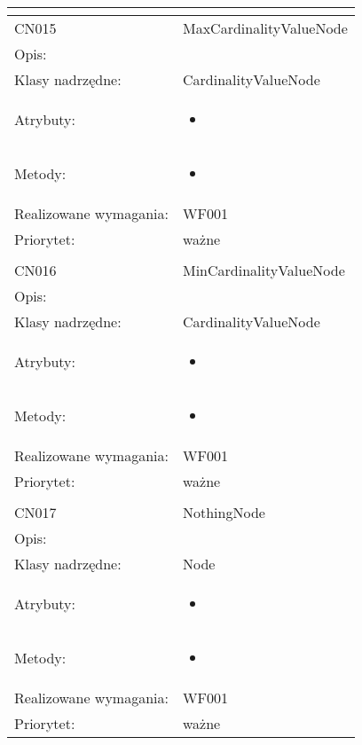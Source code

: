 \documentclass[a4paper,10pt]{article}
\begin{document}
\begin{center}
\begin{longtable}{|m{3cm}|m{9cm}|}
\multicolumn{2}{c}{} \\
 \hline

CN015 & MaxCardinalityValueNode \\ \hline
Opis: &     \\ \hline
Klasy nadrzędne: & CardinalityValueNode     \\ \hline
Atrybuty: & \begin{itemize}
 \item 
\end{itemize}
 \\ \hline
Metody: & \begin{itemize}
 \item 
\end{itemize}
  \\ \hline
Realizowane wymagania: & WF001 \\ \hline
Priorytet: & ważne  \\ \hline

\multicolumn{2}{c}{} \\
 \hline

CN016 & MinCardinalityValueNode \\ \hline
Opis: &     \\ \hline
Klasy nadrzędne: & CardinalityValueNode     \\ \hline
Atrybuty: & \begin{itemize}
 \item 
\end{itemize}
 \\ \hline
Metody: & \begin{itemize}
 \item 
\end{itemize}
  \\ \hline
Realizowane wymagania: & WF001 \\ \hline
Priorytet: & ważne  \\ \hline

\multicolumn{2}{c}{} \\
 \hline

CN017 & NothingNode \\ \hline
Opis: &     \\ \hline
Klasy nadrzędne: & Node     \\ \hline
Atrybuty: & \begin{itemize}
 \item 
\end{itemize}
 \\ \hline
Metody: & \begin{itemize}
 \item 
\end{itemize}
  \\ \hline
Realizowane wymagania: & WF001 \\ \hline
Priorytet: & ważne  \\ \hline


\end{longtable}
\end{center}
\end{document}
